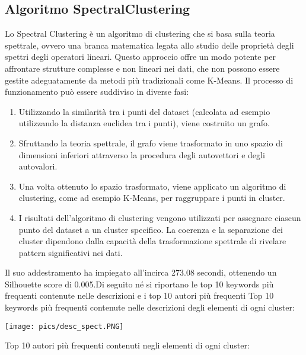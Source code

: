 \documentclass[12pt,oneside]{article}
\begin{document}
    \begin{enumerate}
    \subsection{Algoritmo SpectralClustering}
    \begin{justify}
    Lo Spectral Clustering è un algoritmo di clustering che si basa sulla teoria spettrale, ovvero una branca matematica legata allo studio delle proprietà degli spettri degli operatori lineari. Questo approccio offre un modo potente per affrontare strutture complesse e non lineari nei dati, che non possono essere gestite adeguatamente da metodi più tradizionali come K-Means. 
    Il processo di funzionamento può essere suddiviso in diverse fasi:
    \begin{enumerate}[label=\arabic*)]
        \item Utilizzando la similarità tra i punti del dataset (calcolata ad esempio utilizzando la distanza euclidea tra i punti), viene costruito un grafo. 
        \item Sfruttando la teoria spettrale, il grafo viene trasformato in uno spazio di dimensioni inferiori attraverso la procedura degli autovettori e degli autovalori.
        \item Una volta ottenuto lo spazio trasformato, viene applicato un algoritmo di clustering, come ad esempio K-Means, per raggruppare i punti in cluster. 
        \item I risultati dell'algoritmo di clustering vengono utilizzati per assegnare ciascun punto del dataset a un cluster specifico. La coerenza e la separazione dei cluster dipendono dalla capacità della trasformazione spettrale di rivelare pattern significativi nei dati.
    \end{enumerate}
    Il suo addestramento ha impiegato all’incirca 273.08 secondi, ottenendo un Silhouette score di 0.005.Di seguito né si riportano le top 10 keywords più frequenti contenute nelle descrizioni e i top 10 autori più frequenti
    Top 10 keywords più frequenti contenute nelle descrizioni degli elementi di ogni cluster:
    \end{justify}

    \texttt{[image: pics/desc\_spect.PNG]}
    
    \begin{justify}
    Top 10 autori più frequenti contenuti negli elementi di ogni cluster:
    \end{justify}


\end{enumerate}
\end{document}
